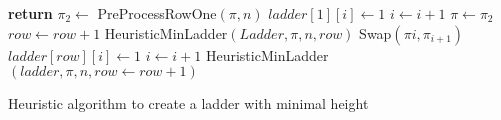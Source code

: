 \begin{algorithm}[!htp]
        \begin{algorithmic}[1]
                    \State \small{\textbf{return}}
                \EndIf
                    \State \small{$\pi_{2} \gets$ {\sc PreProcessRowOne}$(\pi,n)$}
                            \State \small{$ladder[1][i] \gets 1$}
                            \State \small{$i \gets i+1$} 
                        \EndIf
                    \EndFor
                    \State $\pi \gets \pi_{2}$
                    \State $row \gets row+1$
                    \State \small{{\sc HeuristicMinLadder}$(Ladder, \pi, n, row)$}
                \Else
                            \State \small{{\sc Swap}$(\pi{i}, \pi_{i+1})$}
                            \State \small{$ladder[row][i] \gets 1$}
                            \State \small{$i \gets i+1$}
                        \EndIf
                    \EndFor
                    \State \small{{\sc HeuristicMinLadder}$(ladder, \pi, n, row \gets  row+1)$}
                \EndIf
            \EndFunction
        \end{algorithmic}
        \caption{Heuristic algorithm to create a ladder with minimal height}
        \label{Algo:heuristic}
    \end{algorithm}\pagebreak
